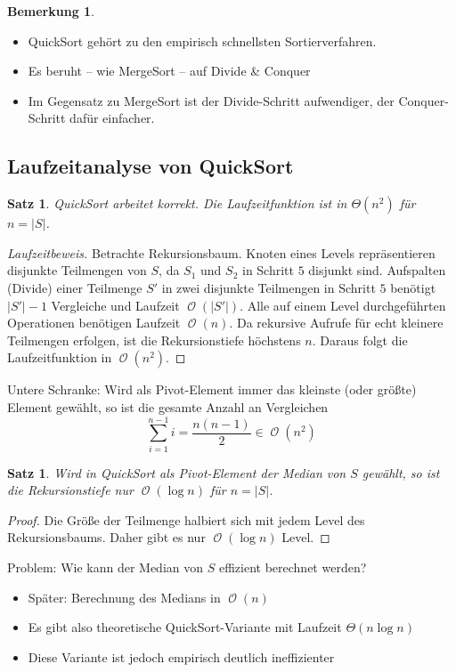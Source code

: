 \documentclass[a4paper,12pt]{article}
\DeclareMathOperator{\BigO}{\mathcal O}
\newtheorem{satz}[axiom]{Satz}
\theoremstyle{definition}
\newtheorem*{bemerkung}{Bemerkung}
\begin{document}
	\setcounter{section}{8}
	\setcounter{subsection}{9}
	\begin{bemerkung}
		\begin{itemize}
			\item QuickSort gehört zu den empirisch schnellsten Sortierverfahren.
			\item Es beruht -- wie MergeSort -- auf Divide \& Conquer
			\item Im Gegensatz zu MergeSort ist der Divide-Schritt aufwendiger, der Conquer-Schritt dafür einfacher.
		\end{itemize}
	\end{bemerkung}
	\subsection{Laufzeitanalyse von QuickSort}
	\begin{satz}
		QuickSort arbeitet korrekt. Die Laufzeitfunktion ist in $\Theta(n^2)$ für $n = \lvert S\rvert$.
	\end{satz}
	\begin{proof}[Laufzeitbeweis]
		Betrachte Rekursionsbaum. Knoten eines Levels repräsentieren disjunkte Teilmengen von $S$, da $S_1$ und $S_2$ in Schritt $5$ disjunkt sind. Aufspalten (Divide) einer Teilmenge $S'$ in zwei disjunkte Teilmengen in Schritt $5$ benötigt $\lvert S'\rvert - 1$ Vergleiche und Laufzeit $\BigO(\lvert S'\rvert)$. Alle auf einem Level durchgeführten Operationen benötigen Laufzeit $\BigO(n)$. Da rekursive Aufrufe für echt kleinere Teilmengen erfolgen, ist die Rekursionstiefe höchstens $n$. Daraus folgt die Laufzeitfunktion in $\BigO(n^2)$. 
	\end{proof}
	Untere Schranke: Wird als Pivot-Element immer das kleinste (oder größte) Element gewählt, so ist die gesamte Anzahl an Vergleichen
	\[
		\sum_{i = 1}^{n - 1} i = \frac{n (n - 1)}{2} \in \BigO(n^2)
	\]
	\begin{satz}
		Wird in QuickSort als Pivot-Element der Median von $S$ gewählt, so ist die Rekursionstiefe nur $\BigO(\log n)$ für $n = \lvert S\rvert$.
	\end{satz}
	\begin{proof}
		Die Größe der Teilmenge halbiert sich mit jedem Level des Rekursionsbaums. Daher gibt es nur $\BigO(\log n)$ Level.
	\end{proof}
	Problem: Wie kann der Median von $S$ effizient berechnet werden?
	\begin{itemize}
		\item Später: Berechnung des Medians in $\BigO(n)$
		\item Es gibt also theoretische QuickSort-Variante mit Laufzeit $\Theta(n \log n)$
		\item Diese Variante ist jedoch empirisch deutlich ineffizienter
	\end{itemize}
\end{document}
